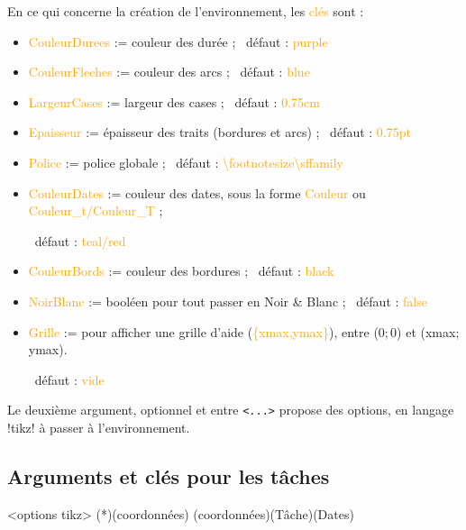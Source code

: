 \documentclass[french,a4paper,11pt]{article}
\newcommand\Cle[1]{{\small\sffamily\textlangle \textcolor{orange}{#1}\textrangle}}
\begin{document}
{{\begin{tipblock}
En ce qui concerne la création de l'environnement, les \Cle{clés} sont :

\begin{itemize}
	\item \Cle{CouleurDurees} := couleur des durée ; \hfill~défaut : \Cle{purple}
	\item \Cle{CouleurFleches} := couleur des arcs ; \hfill~défaut : \Cle{blue}
	\item \Cle{LargeurCases} := largeur des cases ; \hfill~défaut : \Cle{0.75cm}
	\item \Cle{Epaisseur} := épaisseur des traits (bordures et arcs) ; \hfill~défaut : \Cle{0.75pt}
	\item \Cle{Police} := police globale ; \hfill~défaut : \Cle{\textbackslash footnotesize\textbackslash sffamily}
	\item \Cle{CouleurDates} := couleur des dates, sous la forme \Cle{Couleur} ou \Cle{Couleur\_t/Couleur\_T} ;
	
	\hfill~défaut : \Cle{teal/red}
	\item \Cle{CouleurBords} := couleur des bordures ; \hfill~défaut : \Cle{black}
	\item \Cle{NoirBlanc} := booléen pour tout passer en Noir \&{} Blanc ; \hfill~défaut : \Cle{false}
	\item \Cle{Grille} := pour afficher une grille d'aide (\Cle{\{xmax,ymax\}}), entre (0;\,0) et (xmax;\,ymax).
	
	\hfill~défaut : \Cle{vide}
\end{itemize}

Le deuxième argument, optionnel et entre \texttt{<...>} propose des options, en langage \packagetex!tikz! à passer à l'environnement.
\end{tipblock}

\begin{DemoCode}[]
\begin{GrapheMPM}[Grille={14,5}]
\end{GrapheMPM}
\end{DemoCode}

\pagebreak

\subsection{Arguments et clés pour les tâches}

\begin{DemoCode}
\begin{GrapheMPM}[clés]<options tikz>
	\MPMPlaceNotice(*)(coordonnées)
	\MPMPlaceTache(coordonnées)(Tâche)(Dates)
\end{GrapheMPM}
\end{DemoCode}

}}
\end{document}
